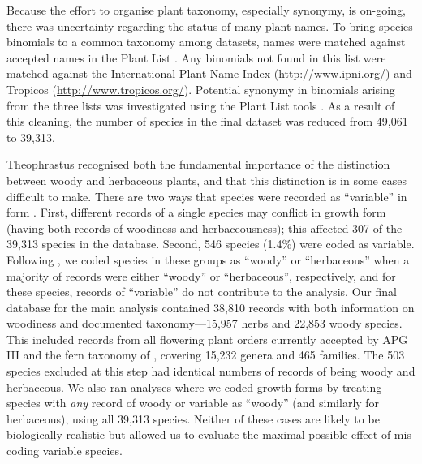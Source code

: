 Because the effort to organise plant taxonomy, especially synonymy, is
on-going, there was uncertainty regarding the status of many plant
names.
%
To bring species binomials to a common taxonomy among datasets, names
were matched against accepted names in the Plant List
\citep{theplantlist}.  Any binomials not found in this list were
matched against the International Plant Name Index
(\url{http://www.ipni.org/}) and Tropicos (\url{http://www.tropicos.org/}).
Potential synonymy in binomials arising from the three lists was
investigated using the Plant List tools \citep{theplantlist}.  
As a result of this cleaning, the number of species in the final
dataset was reduced from 49,061 to 39,313.

Theophrastus recognised both the fundamental importance of the
distinction between woody and herbaceous plants, and that this
distinction is in some cases difficult to make.  There are two ways
that species were recorded as ``variable'' in form
\citep{Beaulieu2013}.  First, different records of a single
species may conflict in growth form (having both records of woodiness
and herbaceousness); this affected 307 of the 39,313 species in the
database.
Second, 546 species (1.4\%) were coded as variable.
Following \citet{Beaulieu2013}, we coded species in these
groups as ``woody'' or ``herbaceous'' when a majority of records were
either ``woody'' or ``herbaceous'', respectively, and for these
species, records of ``variable'' do not contribute to the analysis.
%
%
Our final database for the main analysis contained 38,810 records with
both information on woodiness and documented taxonomy---15,957 herbs
and 22,853 woody species.  
This included records from all flowering plant orders currently
accepted by APG III \citep{APG3} and the fern taxonomy of
\citet{apweb}, covering 15,232 genera and 465 families.
The 503 species excluded at this step had identical numbers of records
of being woody and herbaceous.
We also ran analyses where we coded growth forms by treating species
with \emph{any} record of woody or variable as ``woody'' (and
similarly for herbaceous), using all 39,313 species.  Neither of these
cases are likely to be biologically realistic but allowed us to
evaluate the maximal possible effect of mis-coding variable species.

